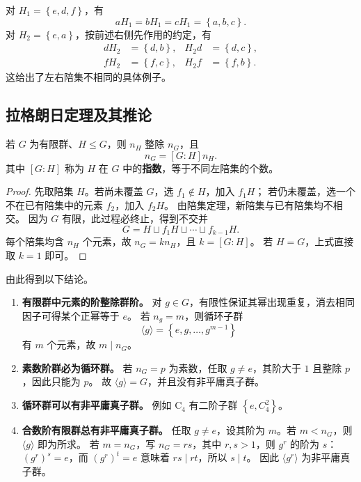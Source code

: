 \begin{example}
对 $H_1=\left\{e,d,f\right\}$，有
\begin{equation}
aH_1=bH_1=cH_1=\left\{a,b,c\right\}.
\end{equation}
对 $H_2=\left\{e,a\right\}$，按前述右侧先作用的约定，有
\begin{align}
dH_2&=\left\{d,b\right\},& H_2d&=\left\{d,c\right\},\\
fH_2&=\left\{f,c\right\},& H_2f&=\left\{f,b\right\}.
\end{align}
这给出了左右陪集不相同的具体例子。
\end{example}

\subsection{拉格朗日定理及其推论}
\begin{theorem}[拉格朗日定理]
若 $G$ 为有限群、$H\leq G$，则 $n_H$ 整除 $n_G$，且
\begin{equation}
n_G=\left[G:H\right]n_H.
\end{equation}
其中 $\left[G:H\right]$ 称为 $H$ 在 $G$ 中的\textbf{指数}，等于不同左陪集的个数。
\end{theorem}
\begin{proof}
先取陪集 $H$。若尚未覆盖 $G$，选 $f_1\notin H$，加入 $f_1H$；
若仍未覆盖，选一个不在已有陪集中的元素 $f_2$，加入 $f_2H$。
由陪集定理，新陪集与已有陪集均不相交。
因为 $G$ 有限，此过程必终止，得到不交并
\begin{equation}
G=H\sqcup f_1H\sqcup\cdots\sqcup f_{k-1}H.
\end{equation}
每个陪集均含 $n_H$ 个元素，故 $n_G=kn_H$，且 $k=\left[G:H\right]$。
若 $H=G$，上式直接取 $k=1$ 即可。
\end{proof}

由此得到以下结论。
\begin{enumerate}
\item \textbf{有限群中元素的阶整除群阶。}
对 $g\in G$，有限性保证其幂出现重复，消去相同因子可得某个正幂等于 $e$。
若 $n_g=m$，则循环子群
\begin{equation}
\langle g\rangle=\left\{e,g,\ldots,g^{m-1}\right\}
\end{equation}
有 $m$ 个元素，故 $m\mid n_G$。
\item \textbf{素数阶群必为循环群。}
若 $n_G=p$ 为素数，任取 $g\ne e$，其阶大于 $1$ 且整除 $p$，因此只能为 $p$。
故 $\langle g\rangle=G$，并且没有非平庸真子群。
\item \textbf{循环群可以有非平庸真子群。}
例如 $\mathrm{C}_4$ 有二阶子群 $\left\{e,C_4^2\right\}$。
\item \textbf{合数阶有限群总有非平庸真子群。}
任取 $g\ne e$，设其阶为 $m$。若 $m<n_G$，则 $\langle g\rangle$ 即为所求。
若 $m=n_G$，写 $n_G=rs$，其中 $r,s>1$，则 $g^r$ 的阶为 $s$：
$\left(g^r\right)^s=e$，而 $\left(g^r\right)^t=e$ 意味着 $rs\mid rt$，所以 $s\mid t$。
因此 $\langle g^r\rangle$ 为非平庸真子群。
\end{enumerate}

